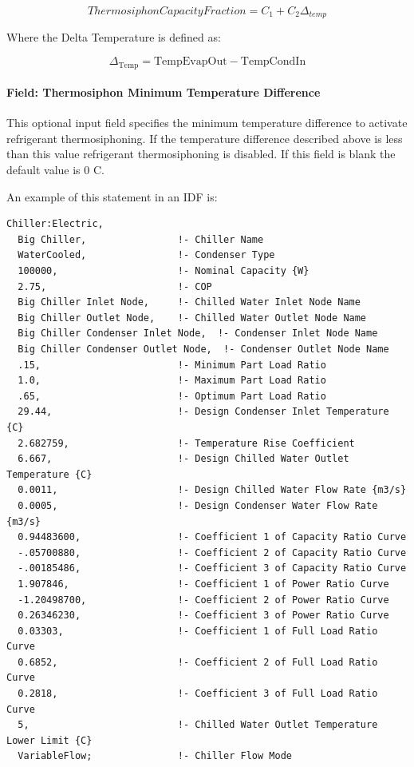\begin{equation}
    ThermosiphonCapacityFraction = {C_1} + {C_2}{\Delta_{temp}}
\end{equation}

Where the Delta Temperature is defined as:

\begin{equation}
{\Delta_{{\mathrm{Temp}}}}
    = {\mathrm{TempEvapOut  -  TempCondIn }}
\end{equation}

\paragraph{Field: Thermosiphon Minimum Temperature Difference}\label{thermosiphon-minimum-temperature-difference2}

This optional input field specifies the minimum temperature difference to activate refrigerant thermosiphoning. If the temperature difference described above is less than this value refrigerant thermosiphoning is disabled. If this field is blank the default value is 0 C.


An example of this statement in an IDF is:

\begin{lstlisting}
Chiller:Electric,
  Big Chiller,                !- Chiller Name
  WaterCooled,                !- Condenser Type
  100000,                     !- Nominal Capacity {W}
  2.75,                       !- COP
  Big Chiller Inlet Node,     !- Chilled Water Inlet Node Name
  Big Chiller Outlet Node,    !- Chilled Water Outlet Node Name
  Big Chiller Condenser Inlet Node,  !- Condenser Inlet Node Name
  Big Chiller Condenser Outlet Node,  !- Condenser Outlet Node Name
  .15,                        !- Minimum Part Load Ratio
  1.0,                        !- Maximum Part Load Ratio
  .65,                        !- Optimum Part Load Ratio
  29.44,                      !- Design Condenser Inlet Temperature {C}
  2.682759,                   !- Temperature Rise Coefficient
  6.667,                      !- Design Chilled Water Outlet Temperature {C}
  0.0011,                     !- Design Chilled Water Flow Rate {m3/s}
  0.0005,                     !- Design Condenser Water Flow Rate {m3/s}
  0.94483600,                 !- Coefficient 1 of Capacity Ratio Curve
  -.05700880,                 !- Coefficient 2 of Capacity Ratio Curve
  -.00185486,                 !- Coefficient 3 of Capacity Ratio Curve
  1.907846,                   !- Coefficient 1 of Power Ratio Curve
  -1.20498700,                !- Coefficient 2 of Power Ratio Curve
  0.26346230,                 !- Coefficient 3 of Power Ratio Curve
  0.03303,                    !- Coefficient 1 of Full Load Ratio Curve
  0.6852,                     !- Coefficient 2 of Full Load Ratio Curve
  0.2818,                     !- Coefficient 3 of Full Load Ratio Curve
  5,                          !- Chilled Water Outlet Temperature Lower Limit {C}
  VariableFlow;               !- Chiller Flow Mode
\end{lstlisting}

